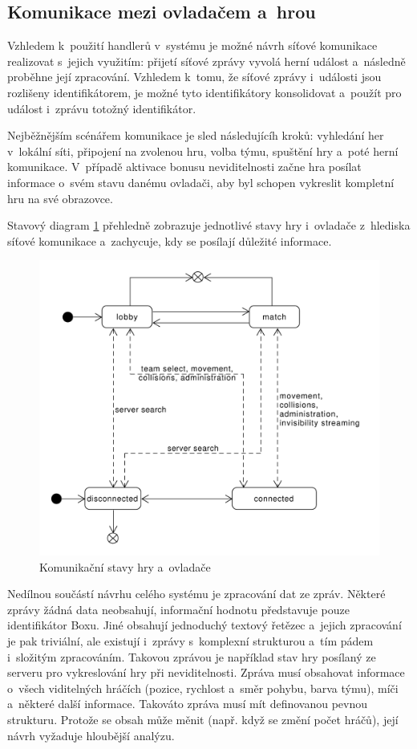 \documentclass[thesis=B,czech,hidelinks]{FITthesis}[2012/06/26] %
\begin{document}
\subsection{Komunikace mezi ovladačem a~hrou}

Vzhledem k~použití handlerů v~systému je možné návrh síťové komunikace realizovat s~jejich využitím: přijetí síťové zprávy vyvolá herní událost a~následně proběhne její zpracování. Vzhledem k~tomu, že síťové zprávy i~události jsou rozlišeny identifikátorem, je možné tyto identifikátory konsolidovat a~použít pro událost i~zprávu totožný identifikátor. 

Nejběžnějším scénářem komunikace je sled následujícíh kroků: vyhledání her v~lokální síti, připojení na zvolenou hru, volba týmu, spuštění hry a~poté herní komunikace. V~případě aktivace bonusu neviditelnosti začne hra posílat informace o~svém stavu danému ovladači, aby byl schopen vykreslit kompletní hru na své obrazovce.

Stavový diagram \ref{picture:communication_states} přehledně zobrazuje jednotlivé stavy hry i~ovladače z~hlediska síťové komunikace a~zachycuje, kdy se posílají důležité informace.

\begin{figure}[h]
\includegraphics[width=\textwidth]{communication_states}
\caption{Komunikační stavy hry a~ovladače}
\label{picture:communication_states}
\end{figure}

Nedílnou součástí návrhu celého systému je zpracování dat ze zpráv. Některé zprávy žádná data neobsahují, informační hodnotu představuje pouze identifikátor Boxu. Jiné obsahují jednoduchý textový řetězec a~jejich zpracování je pak triviální, ale existují i~zprávy s~komplexní strukturou a~tím pádem i~složitým zpracováním. Takovou zprávou je například stav hry posílaný ze serveru pro vykreslování hry při neviditelnosti. Zpráva musí obsahovat informace o~všech viditelných hráčích (pozice, rychlost a~směr pohybu, barva týmu), míči a~některé další informace. Takováto zpráva musí mít definovanou pevnou strukturu. Protože se obsah může měnit (např. když se změní počet hráčů), její návrh vyžaduje hloubější analýzu.
\end{document}
